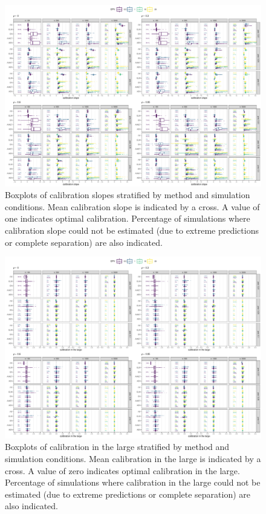 \begin{landscape}
\begin{figure}[!ht]
\center
\includegraphics[width=0.9\linewidth]{figures-appendix/calibration-cslope.pdf}
\caption{Boxplots of calibration slopes stratified by method and simulation
  conditions. Mean calibration slope is indicated by a cross. A value of one
  indicates optimal calibration. Percentage of simulations where calibration
  slope could not be estimated (due to extreme predictions or complete
  separation) are also indicated.} \label{fig:cslope}
\end{figure}
\end{landscape}

\begin{landscape}
\begin{figure}[!ht]
\center
\includegraphics[width=0.9\linewidth]{figures-appendix/calibration-clarge.pdf}
\caption{Boxplots of calibration in the large stratified by method and
  simulation conditions. Mean calibration in the large is indicated by a cross.
  A value of zero indicates optimal calibration in the large. Percentage of
  simulations where calibration in the large could not be estimated (due to
  extreme predictions or complete separation) are also
  indicated.} \label{fig:clarge}
\end{figure}
\end{landscape}
